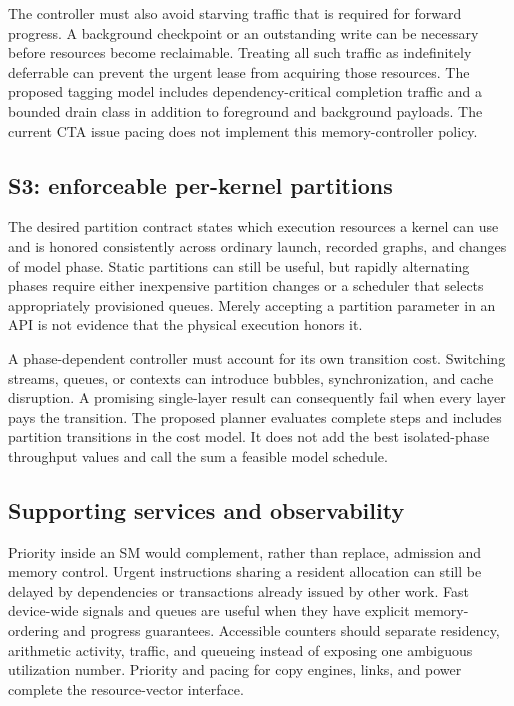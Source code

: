 The controller must also avoid starving traffic that is required for forward
progress. A background checkpoint or an outstanding write can be necessary
before resources become reclaimable. Treating all such traffic as indefinitely
deferrable can prevent the urgent lease from acquiring those resources.
The proposed tagging model includes dependency-critical completion traffic
and a bounded drain class in addition to foreground and background payloads.
The current CTA issue pacing does not implement this memory-controller policy.

\subsection{S3: enforceable per-kernel partitions}
The desired partition contract states which execution resources a kernel can
use and is honored consistently across ordinary launch, recorded graphs,
and changes of model phase. Static partitions can still be useful, but
rapidly alternating phases require either inexpensive partition changes or
a scheduler that selects appropriately provisioned queues. Merely accepting
a partition parameter in an API is not evidence that the physical execution
honors it.

A phase-dependent controller must account for its own transition cost.
Switching streams, queues, or contexts can introduce bubbles, synchronization,
and cache disruption. A promising single-layer result can consequently fail
when every layer pays the transition. The proposed planner evaluates complete
steps and includes partition transitions in the cost model. It does not add
the best isolated-phase throughput values and call the sum a feasible model
schedule.

\subsection{Supporting services and observability}
Priority inside an SM would complement, rather than replace, admission and
memory control. Urgent instructions sharing a resident allocation can still
be delayed by dependencies or transactions already issued by other work.
Fast device-wide signals and queues are useful when they have explicit
memory-ordering and progress guarantees. Accessible counters should separate
residency, arithmetic activity, traffic, and queueing instead of exposing one
ambiguous utilization number. Priority and pacing for copy engines, links,
and power complete the resource-vector interface.

